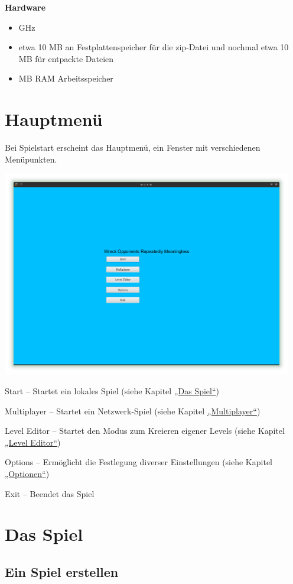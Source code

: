 \documentclass{scrreprt}
\begin{document}
\textbf{Hardware}
\begin{itemize} 
\item GHz
\item etwa 10 MB an Festplattenspeicher für die zip-Datei und nochmal etwa 10 MB für entpackte Dateien
\item MB RAM Arbeitsspeicher
\end{itemize}

\chapter{Hauptmenü}
Bei Spielstart erscheint das Hauptmenü, ein Fenster mit verschiedenen Menüpunkten.

\includegraphics[height=9cm]{Screenshot1.png}

Start – Startet ein lokales Spiel (siehe Kapitel \hyperref[Das Spiel]{ „Das Spiel“})

Multiplayer – Startet ein Netzwerk-Spiel (siehe Kapitel \hyperref[Multiplayer]{„Multiplayer“})

Level Editor – Startet den Modus zum Kreieren eigener Levels (siehe Kapitel \hyperref[Level Editor]{„Level Editor“})

Options – Ermöglicht die Festlegung diverser Einstellungen (siehe Kapitel \hyperref[Optionen]{„Optionen“})

Exit – Beendet das Spiel

\chapter{Das Spiel}
\label{Das Spiel} 
\section{Ein Spiel erstellen}
\end{document}
